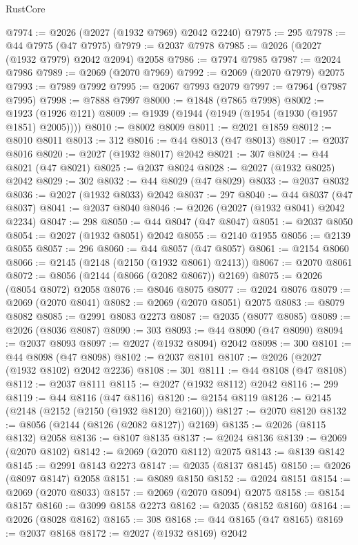 \begin{lexlean}{RustCore}
\begin{coremodule}
@7974 := @2026 (@2027 (@1932 @7969) @2042 @2240)
@7975 := 295
@7978 := @44 @7975 (@47 @7975)
@7979 := @2037 @7978
@7985 := @2026 (@2027 (@1932 @7979) @2042 @2094) @2058
@7986 := @7974 @7985
@7987 := @2024 @7986
@7989 := @2069 (@2070 @7969)
@7992 := @2069 (@2070 @7979) @2075
@7993 := @7989 @7992
@7995 := @2067 @7993 @2079
@7997 := @7964 (@7987 @7995)
@7998 := @7888 @7997
@8000 := @1848 (@7865 @7998)
@8002 := @1923 (@1926 @121)
@8009 := @1939 (@1944 (@1949 (@1954 (@1930 (@1957 @1851) @2005))))
@8010 := @8002 @8009
@8011 := @2021 @1859
@8012 := @8010 @8011
@8013 := 312
@8016 := @44 @8013 (@47 @8013)
@8017 := @2037 @8016
@8020 := @2027 (@1932 @8017) @2042
@8021 := 307
@8024 := @44 @8021 (@47 @8021)
@8025 := @2037 @8024
@8028 := @2027 (@1932 @8025) @2042
@8029 := 302
@8032 := @44 @8029 (@47 @8029)
@8033 := @2037 @8032
@8036 := @2027 (@1932 @8033) @2042
@8037 := 297
@8040 := @44 @8037 (@47 @8037)
@8041 := @2037 @8040
@8046 := @2026 (@2027 (@1932 @8041) @2042 @2234)
@8047 := 298
@8050 := @44 @8047 (@47 @8047)
@8051 := @2037 @8050
@8054 := @2027 (@1932 @8051) @2042
@8055 := @2140 @1955
@8056 := @2139 @8055
@8057 := 296
@8060 := @44 @8057 (@47 @8057)
@8061 := @2154 @8060
@8066 := @2145 (@2148 (@2150 (@1932 @8061) @2413))
@8067 := @2070 @8061
@8072 := @8056 (@2144 (@8066 (@2082 @8067)) @2169)
@8075 := @2026 (@8054 @8072) @2058
@8076 := @8046 @8075
@8077 := @2024 @8076
@8079 := @2069 (@2070 @8041)
@8082 := @2069 (@2070 @8051) @2075
@8083 := @8079 @8082
@8085 := @2991 @8083 @2273
@8087 := @2035 (@8077 @8085)
@8089 := @2026 (@8036 @8087)
@8090 := 303
@8093 := @44 @8090 (@47 @8090)
@8094 := @2037 @8093
@8097 := @2027 (@1932 @8094) @2042
@8098 := 300
@8101 := @44 @8098 (@47 @8098)
@8102 := @2037 @8101
@8107 := @2026 (@2027 (@1932 @8102) @2042 @2236)
@8108 := 301
@8111 := @44 @8108 (@47 @8108)
@8112 := @2037 @8111
@8115 := @2027 (@1932 @8112) @2042
@8116 := 299
@8119 := @44 @8116 (@47 @8116)
@8120 := @2154 @8119
@8126 := @2145 (@2148 (@2152 (@2150 (@1932 @8120) @2160)))
@8127 := @2070 @8120
@8132 := @8056 (@2144 (@8126 (@2082 @8127)) @2169)
@8135 := @2026 (@8115 @8132) @2058
@8136 := @8107 @8135
@8137 := @2024 @8136
@8139 := @2069 (@2070 @8102)
@8142 := @2069 (@2070 @8112) @2075
@8143 := @8139 @8142
@8145 := @2991 @8143 @2273
@8147 := @2035 (@8137 @8145)
@8150 := @2026 (@8097 @8147) @2058
@8151 := @8089 @8150
@8152 := @2024 @8151
@8154 := @2069 (@2070 @8033)
@8157 := @2069 (@2070 @8094) @2075
@8158 := @8154 @8157
@8160 := @3099 @8158 @2273
@8162 := @2035 (@8152 @8160)
@8164 := @2026 (@8028 @8162)
@8165 := 308
@8168 := @44 @8165 (@47 @8165)
@8169 := @2037 @8168
@8172 := @2027 (@1932 @8169) @2042

\end{coremodule}
\end{lexlean}
